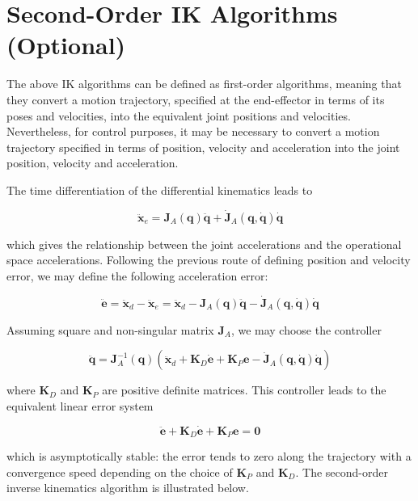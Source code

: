 \documentclass[10pt]{article}
\begin{document}
\section{Second-Order IK Algorithms (Optional)}
The above IK algorithms can be defined as first-order algorithms, meaning that they convert a motion trajectory, specified at the end-effector in terms of its poses and velocities, into the equivalent joint positions and velocities.
Nevertheless, for control purposes, it may be necessary to convert a motion trajectory specified in terms of position, velocity and acceleration into the joint position, velocity and acceleration.

The time differentiation of the differential kinematics   leads to

$$
\ddot{\boldsymbol{x}}_{e}=\boldsymbol{J}_{A}(\boldsymbol{q}) \ddot{\boldsymbol{q}}+\dot{\boldsymbol{J}}_{A}(\boldsymbol{q}, \dot{\boldsymbol{q}}) \dot{\boldsymbol{q}}
$$

which gives the relationship between the joint  accelerations and the operational space accelerations. Following the previous route of defining position and velocity error, we may define the following acceleration error:

$$
\ddot{\boldsymbol{e}}=\ddot{\boldsymbol{x}}_{d}-\ddot{\boldsymbol{x}}_{e}=\ddot{\boldsymbol{x}}_{d}-\boldsymbol{J}_{A}(\boldsymbol{q}) \ddot{\boldsymbol{q}}-\dot{\boldsymbol{J}}_{A}(\boldsymbol{q}, \dot{\boldsymbol{q}}) \dot{\boldsymbol{q}}
$$



Assuming square and non-singular matrix $\boldsymbol{J}_{A}$, we may choose the controller

$$
\ddot{\boldsymbol{q}}=\boldsymbol{J}_{A}^{-1}(\boldsymbol{q})\left(\ddot{\boldsymbol{x}}_{d}+\boldsymbol{K}_{D} \dot{\boldsymbol{e}}+\boldsymbol{K}_{P} \boldsymbol{e}-\dot{\boldsymbol{J}}_{A}(\boldsymbol{q}, \dot{\boldsymbol{q}}) \dot{\boldsymbol{q}}\right)
$$

where $\boldsymbol{K}_{D}$ and $\boldsymbol{K}_{P}$ are positive definite  matrices. This controller leads to the equivalent linear error system

$$
\ddot{\boldsymbol{e}}+\boldsymbol{K}_{D} \dot{\boldsymbol{e}}+\boldsymbol{K}_{P} \boldsymbol{e}=\mathbf{0}
$$

which is asymptotically stable: the error tends to zero along the trajectory with a convergence speed depending on the choice of  $\boldsymbol{K}_{P}$ and $\boldsymbol{K}_{D}$. The second-order inverse kinematics algorithm is illustrated below.
\end{document}
